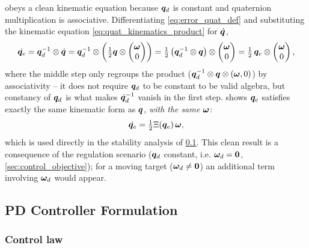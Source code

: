  obeys a clean kinematic equation because $\bm{q}_d$ is constant and quaternion multiplication is associative. Differentiating \cref{eq:error_quat_def} and substituting the kinematic equation \cref{eq:quat_kinematics_product} for $\dot{\bm{q}}$,
\begin{equation}
    \dot{\bm{q}_{e}} = \bm{q}_d^{-1}\otimes\dot{\bm{q}} = \bm{q}_d^{-1}\otimes\left(\tfrac{1}{2}\bm{q}\otimes\begin{pmatrix}\bm{\omega}\\0\end{pmatrix}\right) = \tfrac{1}{2}\left(\bm{q}_d^{-1}\otimes\bm{q}\right)\otimes\begin{pmatrix}\bm{\omega}\\0\end{pmatrix} = \tfrac{1}{2}\,\bm{q}_{e}\otimes\begin{pmatrix}\bm{\omega}\\0\end{pmatrix},
    \label{eq:error_quat_kinematics_derivation}
\end{equation}
where the middle step only regroups the product ($\bm{q}_d^{-1}\otimes\bm{q}\otimes(\bm{\omega},0)$) by associativity -- it does not require $\bm{q}_d$ to be constant to be valid algebra, but constancy of $\bm{q}_d$ is what makes $\dot{\bm{q}}_d^{-1}$ vanish in the first step.  shows $\bm{q}_{e}$ satisfies exactly the same kinematic form as $\bm{q}$, \emph{with the same $\bm{\omega}$}:
\begin{equation}
    \dot{\bm{q}_{e}} = \tfrac{1}{2}\Xi(\bm{q}_{e})\,\bm{\omega},
    \label{eq:error_quat_kinematics}
\end{equation}
which is used directly in the stability analysis of \cref{sec:pd_law}. This clean result is a consequence of the regulation scenario ($\bm{q}_d$ constant, i.e. $\bm{\omega}_d=\bm{0}$, \cref{sec:control_objective}); for a moving target ($\bm{\omega}_d\neq\bm{0}$) an additional term involving $\bm{\omega}_d$ would appear.

\subsection{PD Controller Formulation}
\label{sec:pd_law}

\subsubsection{Control law}

